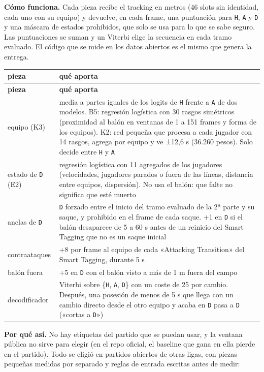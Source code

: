 \documentclass[10pt,a4paper]{article}
\newcommand{\code}[1]{\texttt{\textcolor{codigo}{#1}}}
\begin{document}
\textbf{Cómo funciona.} Cada pieza recibe el tracking en metros (46 slots sin identidad, cada uno con su equipo) y devuelve, en cada frame, una puntuación para \code{H}, \code{A} y \code{D} y una máscara de estados prohibidos, que solo se usa para lo que se sabe seguro. Las puntuaciones se suman y un Viterbi elige la secuencia en cada tramo evaluado. El código que se mide en los datos abiertos es el mismo que genera la entrega.

{\small
\begin{xltabular}{\linewidth}{@{}l>{\raggedright\arraybackslash{}\hsize}X@{}}
\toprule
\textbf{pieza} & \textbf{qué aporta} \\
\midrule
\endfirsthead
\toprule
\textbf{pieza} & \textbf{qué aporta} \\
\midrule
\endhead
\bottomrule
\endlastfoot
equipo (K3) & media a partes iguales de los logits de \code{H} frente a \code{A} de dos modelos. B5: regresión logística con 30 rasgos simétricos (proximidad al balón en ventanas de 1 a 151 frames y forma de los equipos). K2: red pequeña que procesa a cada jugador con 14 rasgos, agrega por equipo y ve ±12,6 s (36.260 pesos). Solo decide entre \code{H} y \code{A} \\
estado de \code{D} (E2) & regresión logística con 11 agregados de los jugadores (velocidades, jugadores parados o fuera de las líneas, distancia entre equipos, dispersión). No usa el balón: que falte no significa que esté muerto \\
anclas de \code{D} & \code{D} forzado entre el inicio del tramo evaluado de la 2ª parte y su saque, y prohibido en el frame de cada saque. +1 en \code{D} si el balón desaparece de 5 a 60 s antes de un reinicio del Smart Tagging que no es un saque inicial \\
contraataques & +8 por frame al equipo de cada «Attacking Transition» del Smart Tagging, durante 5 s \\
balón fuera & +5 en \code{D} con el balón visto a más de 1 m fuera del campo \\
decodificador & Viterbi sobre \{\code{H}, \code{A}, \code{D}\} con un coste de 25 por cambio. Después, una posesión de menos de 5 s que llega con un cambio directo desde el otro equipo y acaba en \code{D} pasa a \code{D} («cortas a \code{D}») \\
\end{xltabular}
}

\textbf{Por qué así.} No hay etiquetas del partido que se puedan usar, y la ventana pública no sirve para elegir (en el repo oficial, el baseline que gana en ella pierde en el partido). Todo se eligió en partidos abiertos de otras ligas, con piezas pequeñas medidas por separado y reglas de entrada escritas antes de medir:
\end{document}
